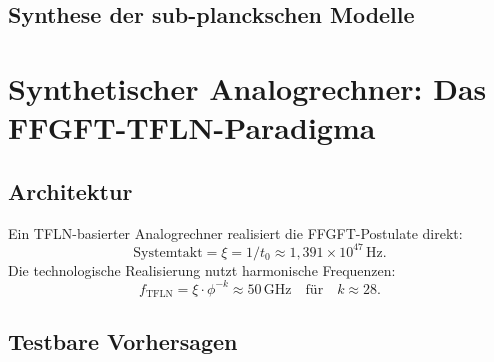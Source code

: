 \subsection{Synthese der sub-planckschen Modelle}

\begin{table}[H]
\centering
\caption{Vergleich sub-planckscher Modelle}
\smallskip
{}
\end{table}

\section{Synthetischer Analogrechner: Das FFGFT-TFLN-Paradigma}

\subsection{Architektur}

Ein TFLN-basierter Analogrechner realisiert die FFGFT-Postulate direkt:
\begin{equation}
  \text{Systemtakt} = \xi = 1/t_0 \approx 1{,}391 \times 10^{47}\,\text{Hz}.
\end{equation}
Die technologische Realisierung nutzt harmonische Frequenzen:
\begin{equation}
  f_{\text{TFLN}} = \xi \cdot \phi^{-k} \approx 50\,\text{GHz}
  \quad \text{für} \quad k \approx 28.
\end{equation}

\subsection{Testbare Vorhersagen}

